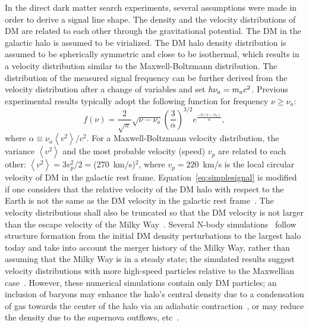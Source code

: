 In the direct dark matter search experiments, several assumptions were 
made in order to derive a signal line shape. 
The density and the velocity distributions of DM are related to each other 
through the gravitational potential. The DM in the galactic halo is assumed 
to be virialized. The DM halo density distribution is assumed 
to be spherically symmetric and close to be isothermal, which results in a 
velocity distribution similar to the Maxwell-Boltzmann distribution. The 
distribution of the measured signal frequency can be further derived from the 
velocity distribution after a change of variables and set 
\(h\nu_a = m_a c^2\). Previous experimental results typically adopt the 
following function for frequency $\nu\ge\nu_a$: 
\begin{equation}
f(\nu) = \frac{2}{\sqrt{\pi}}\sqrt{\nu-\nu_a}\left(\frac{3}{\alpha}\right)^{3/2}
e^{\frac{-3\left(\nu-\nu_a\right)}{\alpha}}, 
\label{eq:simplesignal}
\end{equation}
where $\alpha\equiv  \nu_a \left<v^2\right>/c^2$. For a Maxwell-Boltzmann velocity 
distribution, the variance $\left<v^2\right>$ and the most probable velocity 
(speed) $v_p$ are related to each other:
$\left<v^2\right>=3v_p^2/2=$(270~km/s)$^2$, where $v_p=220$~km/s is the local 
circular velocity of DM in the galactic rest frame. 
Equation~\eqref{eq:simplesignal} 
is modified if one considers that the relative velocity of the DM halo with 
respect to the Earth is not the same as the DM velocity in the galactic rest 
frame~\cite{SignalLineShapeI}. The velocity distributions shall also be 
truncated so that the DM velocity is not larger than the escape velocity of 
the Milky Way~\cite{Lisanti:2016jxe}. 
Several N-body simulations~\cite{Diemand:2008in,Springel:2008cc} follow 
structure formation from the initial DM density perturbations to the largest 
halo today and take into account the merger history of the Milky Way, rather 
than assuming that the Milky Way is in a steady state; the simulated results 
 suggest velocity distributions with more high-speed particles relative 
to the Maxwellian case~\cite{Navarro:1995iw,Burkert:1995yz}. However, these 
numerical simulations contain only DM particles; an inclusion of baryons may 
enhance the halo's central density due to a condensation of gas towards the 
center of the halo via an adiabatic 
contraction~\cite{Blumenthal:1985qy,Gnedin:2004cx}, or may reduce 
the density due to the supernova outflows, etc~\cite{Mashchenko:2007jp,Governato:2009bg}. 


